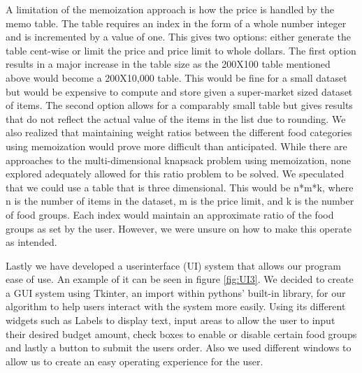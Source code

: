 \documentclass[10pt,journal,compsoc]{IEEEtran}
\begin{document}
A limitation of the memoization approach is how the price is handled by the
memo table. The table requires an index in the form of a whole number integer
and is incremented by a value of one. This gives two options: either generate
the table cent-wise or limit the price and price limit to whole dollars. The
first option results in a major increase in the table size as the 200X100 table
mentioned above would become a 200X10,000 table. This would be fine for a small
dataset but would be expensive to compute and store given a super-market sized
dataset of items. The second option allows for a comparably small table but
gives results that do not reflect the actual value of the items in the list due
to rounding. We also realized that maintaining weight ratios between the
different food categories using memoization would prove more difficult than
anticipated. While there are approaches to the multi-dimensional knapsack
problem using memoization, none explored adequately allowed for this ratio
problem to be solved. We speculated that we could use a table that is three
dimensional. This would be n*m*k, where n is the number of items in the dataset,
m is the price limit, and k is the number of food groups. Each index would
maintain an approximate ratio of the food groups as set by the user. However, we
were unsure on how to make this operate as intended.

Lastly we have developed a userinterface (UI) system that allows our program
ease of use. An example of it can be seen in figure \ref{fig:UI3}. We decided to
create a GUI system using Tkinter, an import within pythons' built-in library,
for our algorithm to help users interact with the system more easily. Using its
different widgets such as Labels to display text, input areas to allow the user
to input their desired budget amount, check boxes to enable or disable certain
food groups and lastly a button to submit the users order. Also we used
different windows to allow us to create an easy operating experience for the
user.
\end{document}
